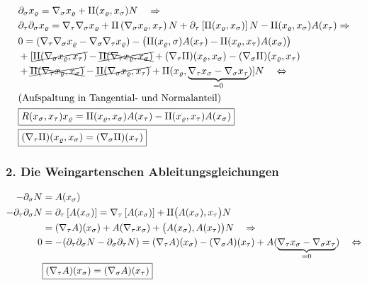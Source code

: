 \begin{align*}
 &\partial_\sigma x_\varrho = \nabla_\sigma x_\varrho + \Rom2(x_\varrho, x_\sigma) N \quad\Rightarrow \\
 &\partial_\tau \partial_\sigma x_\varrho = \nabla_\tau \nabla_\sigma x_\varrho + \Rom2\left( \nabla_\sigma x_\varrho, x_\tau\right) N + \partial_\tau \left[\Rom2(x_\varrho, x_\sigma)\right] N - \Rom2(x_\varrho, x_\sigma) A(x_\tau) \Rightarrow \\
 &0 = (\nabla_\tau \nabla_\sigma x_\varrho - \nabla_\sigma \nabla_\tau x_\varrho) - \big(\Rom2(x_\varrho, \sigma) A(x_\tau) - \Rom2(x_\varrho, x_\tau)A(x_\sigma)\big) \\
 &+[ \cancel{\Rom2 (\nabla_\sigma x_\varrho, x_\tau)} - \xcancel{\Rom2(\nabla_\tau x_\varrho, x_\sigma)} + (\nabla_\tau \Rom2)(x_\varrho, x_\sigma) - (\nabla_\sigma \Rom2)(x_\varrho, x_\tau) \\
 &+ \xcancel{\Rom2( \nabla_\tau x_\varrho, x_\sigma)} - \cancel{\Rom2( \nabla_\sigma x_\varrho, x_\tau)} + \Rom2 (x_\varrho, \underbrace{\nabla_\tau x_\sigma - \nabla_\sigma x_\tau}_{= 0})] N \quad\Leftrightarrow \\
 &\text{(Aufspaltung in Tangential- und Normalanteil)} \\
 &\boxed{R(x_\sigma, x_\tau) x_\varrho = \Rom2 (x_\varrho, x_\sigma) A(x_\tau) - \Rom2(x_\varrho, x_\tau) A(x_\sigma)} \\
 &\boxed{(\nabla_\tau \Rom2)(x_\varrho, x_\sigma) = (\nabla_\sigma \Rom2)(x_\tau)}
\end{align*}

\subsubsection{2. Die Weingartenschen Ableitungsgleichungen}

\begin{align*}
 -\partial_\sigma N &= A(x_\sigma) \\
 -\partial_\tau \partial_\sigma N &= \partial_\tau \left[A(x_\sigma)\right] = \nabla_\tau \left[A(x_\sigma)\right] + \Rom2 \big(A(x_\sigma), x_\tau\big) N \\
 & = (\nabla_\tau A)(x_\sigma) + A(\nabla_\tau x_\sigma) + \big(A(x_\sigma), A(x_\tau)\big) N \quad \Rightarrow \\
 0 &= - (\partial_\tau \partial_\sigma N - \partial_\sigma \partial_\tau N) = (\nabla_\tau A)(x_\sigma) - (\nabla_\sigma A)(x_\tau) + A(\underbrace{\nabla_\tau x_\sigma - \nabla_\sigma x_\tau}_{= 0}) \quad \Leftrightarrow \\
 &\boxed{(\nabla_\tau A)(x_\sigma) = (\nabla_\sigma A)(x_\tau)}
\end{align*}

